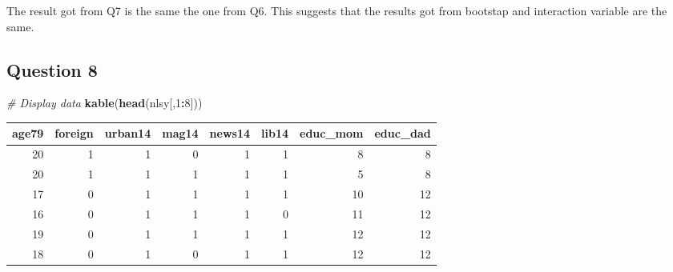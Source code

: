 \documentclass[
]{article}
\newenvironment{Shaded}{\begin{snugshade}}{\end{snugshade}}
\newcommand{\CommentTok}[1]{\textcolor[rgb]{0.56,0.35,0.01}{\textit{#1}}}
\newcommand{\DecValTok}[1]{\textcolor[rgb]{0.00,0.00,0.81}{#1}}
\newcommand{\KeywordTok}[1]{\textcolor[rgb]{0.13,0.29,0.53}{\textbf{#1}}}
\newcommand{\NormalTok}[1]{#1}
\newcommand{\OperatorTok}[1]{\textcolor[rgb]{0.81,0.36,0.00}{\textbf{#1}}}
\begin{document}
The result got from Q7 is the same the one from Q6. This suggests that
the results got from bootstap and interaction variable are the same.

\hypertarget{question-8}{%
\subsection{Question 8}\label{question-8}}

\begin{Shaded}
\begin{Highlighting}[]
\CommentTok{# Display data}
\KeywordTok{kable}\NormalTok{(}\KeywordTok{head}\NormalTok{(nlsy[,}\DecValTok{1}\OperatorTok{:}\DecValTok{8}\NormalTok{]))}
\end{Highlighting}
\end{Shaded}

\begin{longtable}[]{@{}rrrrrrrr@{}}
\toprule
age79 & foreign & urban14 & mag14 & news14 & lib14 & educ\_mom &
educ\_dad\tabularnewline
\midrule
\endhead
20 & 1 & 1 & 0 & 1 & 1 & 8 & 8\tabularnewline
20 & 1 & 1 & 1 & 1 & 1 & 5 & 8\tabularnewline
17 & 0 & 1 & 1 & 1 & 1 & 10 & 12\tabularnewline
16 & 0 & 1 & 1 & 1 & 0 & 11 & 12\tabularnewline
19 & 0 & 1 & 1 & 1 & 1 & 12 & 12\tabularnewline
18 & 0 & 1 & 0 & 1 & 1 & 12 & 12\tabularnewline
\bottomrule
\end{longtable}
\end{document}
